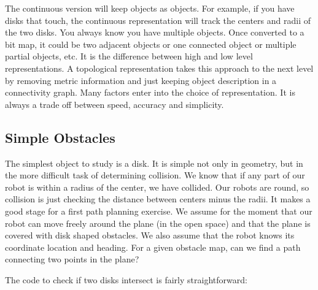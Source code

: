 The continuous version will keep objects as objects. For example, if you
have disks that touch, the continuous representation will track the
centers and radii of the two disks. You always know you have multiple
objects. Once converted to a bit map, it could be two adjacent objects
or one connected object or multiple partial objects, etc. It is the
difference between high and low level representations. A topological
representation takes this approach to the next level by removing metric
information and just keeping object description in a connectivity graph.
Many factors enter into the choice of representation. It is always a
trade off between speed, accuracy and simplicity.

\hypertarget{simple-obstacles}{%
\subsection{Simple Obstacles}\label{simple-obstacles}}

The simplest object to study is a disk. It is simple not only in
geometry, but in the more difficult task of determining collision. We
know that if any part of our robot is within a radius of the center, we
have collided. Our robots are round, so collision is just checking the
distance between centers minus the radii. It makes a good stage for a
first path planning exercise. We assume for the moment that our robot
can move freely around the plane (in the open space) and that the plane
is covered with disk shaped obstacles. We also assume that the robot
knows its coordinate location and heading. For a given obstacle map, can
we find a path connecting two points in the plane?

The code to check if two disks intersect is fairly straightforward:

\hypertarget{lst:collisiondetection}{%
\label{lst:collisiondetection}}%
\begin{Shaded}
\begin{Highlighting}[]
\OperatorTok{,}\OperatorTok{,}\OperatorTok{,}
\OperatorTok{=}\NormalTok{ center1[}\NormalTok{]}
\OperatorTok{=}\NormalTok{ center1[}\NormalTok{]}
\OperatorTok{=}\NormalTok{ center2[}\NormalTok{]}
\OperatorTok{=}\NormalTok{ center2[}\NormalTok{]}
\OperatorTok{=}\OperatorTok{{-}}\OperatorTok{*}\OperatorTok{{-}}\OperatorTok{+}\OperatorTok{{-}}\OperatorTok{*}\OperatorTok{{-}}\OperatorTok{{-}}\OperatorTok{{-}}
\end{Highlighting}
\end{Shaded}


